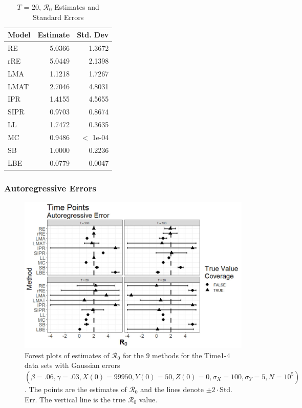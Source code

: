 \documentclass[12pt]{article}
\newcommand{\xxsir}{\ensuremath{9} } %
\newcommand{\rr}{\ensuremath{\mathcal{R}_0}}
\begin{document}
\begin{table}[H]
	\centering
	\begin{tabular}[t]{l|r|r}
		\hline
		Model & Estimate & Std. Dev\\
		\hline
		RE & 5.0366 & 1.3672\\
		\hline
		rRE & 5.0449 & 2.1398\\
		\hline
		LMA & 1.1218 & 1.7267\\
		\hline
		LMAT & 2.7046 & 4.8031\\
		\hline
		IPR & 1.4155 & 4.5655\\
		\hline
		SIPR & 0.9703 & 0.8674\\
		\hline
		LL & 1.7472 & 0.3635\\
		\hline
		MC & 0.9486 & $<$ 1e-04\\
		\hline
		SB & 1.0000 & 0.2236\\
		\hline
		LBE & 0.0779 & 0.0047\\
		\hline
	\end{tabular}
	\caption{$T$ = 20, $\rr$ Estimates and Standard Errors}
\end{table}

\subsubsection{Autoregressive Errors}
\begin{figure}[H]
	\centering
	\includegraphics[scale=0.5]{images/time_ar.jpg}
	\caption{Forest plots of estimates of $\rr$ for the \xxsir methods for the Time1-4 data sets with Gaussian errors $(\beta=.06, \gamma=.03, X(0)=99950, Y(0)=50, Z(0)=0, \sigma_X=100, \sigma_Y=5, N=10^5)$.  The points are the estimates of $\rr$ and the lines denote $\pm 2\cdot $Std. Err.  The vertical line is the true $\rr$ value.}
\end{figure}
\end{document}
